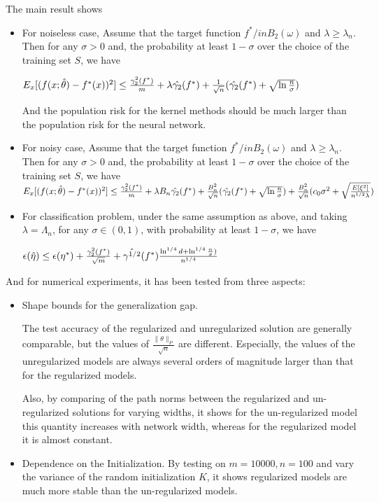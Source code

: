\documentclass{article}
\begin{document}
The main result shows 
\begin{itemize}
\item For noiseless case, Assume that the target function $f^* /in B_2(\omega)$ and $\lambda \geq \lambda_n$. Then for any $\sigma > 0 $ and, the probability at least $1-\sigma$ over the choice of the training set $S$, we have
    \begin{center}
      $E_x[(f(x;\Hat{\theta})-f^*(x))^2]\leq\frac{\gamma_2^2(f^*)}{m} +\lambda \Hat{\gamma_2}(f^*)+\frac{1}{\sqrt{n}}(\Hat{\gamma_2}(f^*)+\sqrt{\ln{\frac{n}{\sigma}}})$
    \end{center}
And the population risk for the kernel methods should be much larger than the population risk for the neural network.
\item For noisy case, Assume that the target function $f^* /in B_2(\omega)$ and $\lambda \geq \lambda_n$. Then for any $\sigma > 0 $ and, the probability at least $1-\sigma$ over the choice of the training set $S$, we have
      $E_x[(f(x;\Hat{\theta})-f^*(x))^2]\leq\frac{\gamma_2^2(f^*)}{m} +\lambda B_n \Hat{\gamma_2}(f^*)+\frac{B^2_n}{\sqrt{n}}(\Hat{\gamma_2}(f^*)+\sqrt{\ln{\frac{n}{\sigma}}})+\frac{B^2_n}{\sqrt{n}}(c_0 \sigma^2+\sqrt{\frac{E[\xi^2]}{n^{1/2}\lambda}})$
\item For classification problem, under the same assumption as above, and taking $\lambda = \Lambda_n$, for any $\sigma \in (0,1)$, with probability at least $1-\sigma$, we have
    \begin{center}
      $\epsilon(\Hat{\eta}) \leq \epsilon(\eta ^*) + \frac{\gamma_2^2(f^*)}{\sqrt{m}}+\Hat{\gamma^{1/2}}(f^*)\frac{\ln^{1/4}{d}+\ln^{1/4}{\frac{n}{\sigma}})}{n^{1/4}}$
    \end{center}
\end{itemize}

And for numerical experiments, it has been tested from three aspects:
\begin{itemize}
\item Shape bounds for the generalization gap.

The test accuracy of the regularized and unregularized solution are generally comparable, but the values of $\frac{\|\theta\|_P}{\sqrt{n}}$ are different. Especially, the values of the unregularized models are always several orders of magnitude larger than that for the regularized models.

Also, by comparing of the path norms between the regularized and un-regularized solutions for varying widths, it shows for the un-regularized model this quantity increases with network width, whereas for the regularized model it is almost constant. 
\item Dependence on the Initialization.
By testing on $m=10000,n= 100$ and vary the variance of the random initialization $K$, it shows regularized models are much more stable than the un-regularized models. 
\end{itemize}
\end{document}
